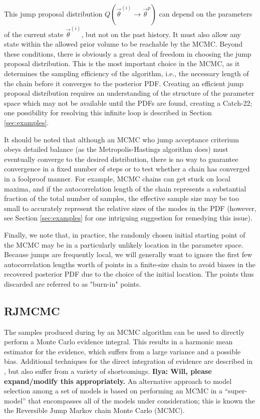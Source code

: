 \documentclass[prd,preprint]{revtex4}
\newcommand{\vtheta}{\vec{\theta}}
\newcommand{\ilya}[1]{{\color{red} \bf Ilya: #1}}
\begin{document}
This jump proposal distribution $Q(\vtheta^{(i)} \to \vtheta^p)$ can depend on the parameters of the current state $\vtheta^{(i)}$, but not on the past history.  It must also allow any state within the allowed prior volume to be reachable by the MCMC.  Beyond these conditions, there is obviously a great deal of freedom in choosing the jump proposal distribution.  This is the most important choice in the MCMC, as it determines the sampling efficiency of the algorithm, i.e., the necessary length of the chain before it converges to the posterior PDF.  Creating an efficient jump proposal distribution requires an understanding of the structure of the parameter space which may not be available until the PDFs are found, creating a Catch-22; one possibility for resolving this infinite loop is described in Section \ref{sec:examples}.

It should be noted that although an MCMC who jump acceptance criterium obeys detailed balance (as the Metropolis-Hastings algorithm does) must eventually converge to the desired distribution, there is no way to guarantee convergence in a fixed number of steps or to test whether a chain has converged in a foolproof manner.  For example, MCMC chains can get stuck on local maxima, and if the autocorrelation length of the chain represents a substantial fraction of the total number of samples, the effective sample size may be too small to accurately represent the relative sizes of the modes in the PDF (however, see Section \ref{sec:examples} for one intriguing suggestion for remedying this issue).   

Finally, we note that, in practice, the randomly chosen initial starting point of the MCMC may be in a particularly unlikely location in the parameter space.  Because jumps are frequently local, we will generally want to ignore the first few autocorrelation lengths worth of points in a finite-size chain to avoid biases in the recovered posterior PDF due to the choice of the initial location.  The points thus discarded are referred to as "burn-in" points.

\subsection{RJMCMC}

The samples produced during by an MCMC algorithm can be used to directly perform a Monte Carlo evidence integral.  This results in a harmonic mean estimator for the evidence, which suffers from a large variance and a possible bias.  Additional techniques for the direct integration of evidence are described in \cite{Weinberg}, but also suffer from a variety of shortcomings.  \ilya{Will, please expand/modify this appropriately.}  An alternative approach to model selection among a set of models is based on performing an MCMC in a ``super-model'' that encompasses all of the models under consideration; this is known the the Reversible Jump Markov chain Monte Carlo (MCMC).
\end{document}
